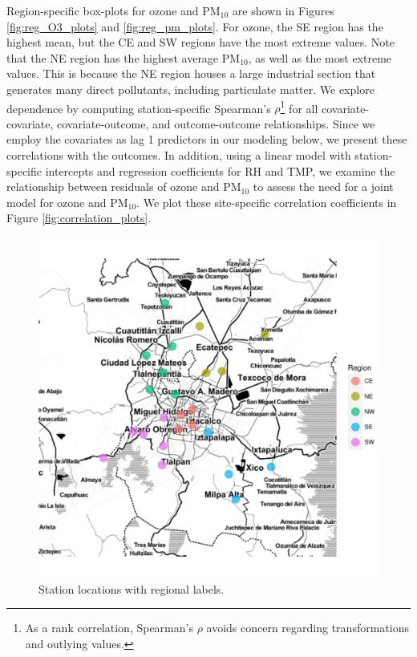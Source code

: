 \documentclass[alpha-refs]{wiley-article}
\begin{document}
Region-specific box-plots for ozone and $\text{PM}_{10}$ are shown in Figures \ref{fig:reg_O3_plots} and \ref{fig:reg_pm_plots}. For ozone, the SE region has the highest mean, but the CE and SW regions have the most extreme values. Note that the NE region has the highest average $\text{PM}_{10}$, as well as the most extreme values. This is because the NE region houses a large industrial section that generates many direct pollutants, including particulate matter. We explore dependence 
by computing station-specific Spearman's $\rho$\footnote{As a rank correlation, Spearman's $\rho$ avoids concern regarding transformations and outlying values.} for all covariate-covariate, covariate-outcome, and outcome-outcome relationships. Since we employ the covariates as lag 1 predictors in our modeling below, we present these correlations with the outcomes. In addition, using a linear model with station-specific intercepts and regression coefficients for RH and TMP, we examine the relationship between residuals of ozone and $\text{PM}_{10}$ to assess the need for a joint model for ozone and $\text{PM}_{10}$. We plot these site-specific correlation coefficients in Figure \ref{fig:correlation_plots}.
  \vspace{-2mm}
\begin{figure}[H]
  \begin{center}
      \includegraphics[width=.75\textwidth]{stat_loc_bw.pdf}
  \end{center}
  \vspace{-12mm}
       \caption{Station locations with regional labels. %
}\label{fig:station_loc}
\end{figure}
\vspace{-3mm}
\end{document}
